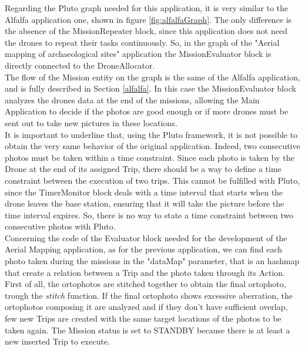 Regarding the Pluto graph needed for this application, it is very similar to the Alfalfa\cite{alfalfa} application one, shown in figure \ref{fig:alfalfaGraph}.
The only difference is the absence of the MissionRepeater block, since this application does not need the drones to repeat their tasks continuously.
So, in the graph of the "Aerial mapping of archaeological sites" application the MissionEvaluator block is directly connected to the DroneAllocator.
\\

The flow of the Mission entity on the graph is the same of the Alfalfa\cite{alfalfa} application, and is fully described in Section \ref{alfalfa}.
In this case the MissionEvaluator block analyzes the drones data at the end of the missions, allowing the Main Application to decide if the photos are good enough or if more drones must be sent out to take new pictures in these locations.
\\

It is important to underline that, using the Pluto framework, it is not possible to obtain the very same behavior of the original application.
Indeed, two consecutive photos must be taken within a time constraint.
Since each photo is taken by the Drone at the end of its assigned Trip, there should be a way to define a time constraint between the execution of two trips.
This cannot be fulfilled with Pluto, since the TimerMonitor block deals with a time interval that starts when the drone leaves the base station, ensuring that it will take the picture before the time interval expires.
So, there is no way to state a time constraint between two consecutive photos with Pluto.
\\

Concerning the code of the Evaluator block needed for the development of the Aerial Mapping\cite{putti} application, as for the previous application, we can find each photo taken during the missions in the "dataMap" parameter, that is an hashmap that create a relation between a Trip and the photo taken through its Action.
First of all, the ortophotos are stitched together to obtain the final ortophoto, trough the \textit{stitch} function.
If the final ortophoto shows excessive aberration, the ortophotos composing it are analyzed and if they don't have sufficient overlap, few new Trips are created with the same target locations of the photos to be taken again. 
The Mission status is set to STANDBY because there is at least a new inserted Trip to execute.
\\

